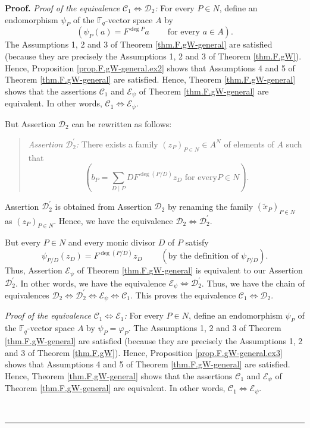 \documentclass[numbers=enddot,12pt,final,onecolumn,notitlepage]{scrartcl}%
\theoremstyle{definition}
\newenvironment{statement}{\begin{quote}}{\end{quote}}
\newenvironment{proof}[1][Proof]{\noindent\textbf{#1.} }{\ \rule{0.5em}{0.5em}}
\let\sumnonlimits\sum
\renewcommand{\sum}{\sumnonlimits\limits}
\begin{document}
\begin{proof}
\textit{Proof of the equivalence }$\mathcal{C}_{1}\Longleftrightarrow
\mathcal{D}_{2}$\textit{:} For every $P\in N$, define an endomorphism
$\psi_{P}$ of the $\mathbb{F}_{q}$-vector space $A$ by%
\[
\left(  \psi_{P}\left(  a\right)  =F^{\deg P}a\ \ \ \ \ \ \ \ \ \ \text{for
every }a\in A\right)  .
\]
The Assumptions 1, 2 and 3 of Theorem \ref{thm.F.gW-general} are satisfied
(because they are precisely the Assumptions 1, 2 and 3 of Theorem
\ref{thm.F.gW}). Hence, Proposition \ref{prop.F.gW-general.ex2} shows that
Assumptions 4 and 5 of Theorem \ref{thm.F.gW-general} are satisfied. Hence,
Theorem \ref{thm.F.gW-general} shows that the assertions $\mathcal{C}_{1}$ and
$\mathcal{E}_{\psi}$ of Theorem \ref{thm.F.gW-general} are equivalent. In
other words, $\mathcal{C}_{1}\Longleftrightarrow\mathcal{E}_{\psi}$.

But Assertion $\mathcal{D}_{2}$ can be rewritten as follows:

\begin{statement}
\textit{Assertion }$\mathcal{D}_{2}^{\prime}$\textit{:} There exists a family
$\left(  z_{P}\right)  _{P\in N}\in A^{N}$ of elements of $A$ such that%
\[
\left(  b_{P}=\sum_{D\mid P}DF^{\deg\left(  P/D\right)  }z_{D}\text{ for every
}P\in N\right)  .
\]

\end{statement}

Assertion $\mathcal{D}_{2}^{\prime}$ is obtained from Assertion $\mathcal{D}%
_{2}$ by renaming the family $\left(  \widetilde{x}_{P}\right)  _{P\in N}$ as
$\left(  z_{P}\right)  _{P\in N}$. Hence, we have the equivalence
$\mathcal{D}_{2}\Longleftrightarrow\mathcal{D}_{2}^{\prime}$.

But every $P\in N$ and every monic divisor $D$ of $P$ satisfy%
\[
\psi_{P/D}\left(  z_{D}\right)  =F^{\deg\left(  P/D\right)  }z_{D}%
\ \ \ \ \ \ \ \ \ \ \left(  \text{by the definition of }\psi_{P/D}\right)  .
\]
Thus, Assertion $\mathcal{E}_{\psi}$ of Theorem \ref{thm.F.gW-general} is
equivalent to our Assertion $\mathcal{D}_{2}^{\prime}$. In other words, we
have the equivalence $\mathcal{E}_{\psi}\Longleftrightarrow\mathcal{D}%
_{2}^{\prime}$. Thus, we have the chain of equivalences $\mathcal{D}%
_{2}\Longleftrightarrow\mathcal{D}_{2}^{\prime}\Longleftrightarrow
\mathcal{E}_{\psi}\Longleftrightarrow\mathcal{C}_{1}$. This proves the
equivalence $\mathcal{C}_{1}\Longleftrightarrow\mathcal{D}_{2}$.

\textit{Proof of the equivalence }$\mathcal{C}_{1}\Longleftrightarrow
\mathcal{E}_{1}$\textit{:} For every $P\in N$, define an endomorphism
$\psi_{P}$ of the $\mathbb{F}_{q}$-vector space $A$ by $\psi_{P}=\varphi_{P}$.
The Assumptions 1, 2 and 3 of Theorem \ref{thm.F.gW-general} are satisfied
(because they are precisely the Assumptions 1, 2 and 3 of Theorem
\ref{thm.F.gW}). Hence, Proposition \ref{prop.F.gW-general.ex3} shows that
Assumptions 4 and 5 of Theorem \ref{thm.F.gW-general} are satisfied. Hence,
Theorem \ref{thm.F.gW-general} shows that the assertions $\mathcal{C}_{1}$ and
$\mathcal{E}_{\psi}$ of Theorem \ref{thm.F.gW-general} are equivalent. In
other words, $\mathcal{C}_{1}\Longleftrightarrow\mathcal{E}_{\psi}$.


\end{proof}
\end{document}
